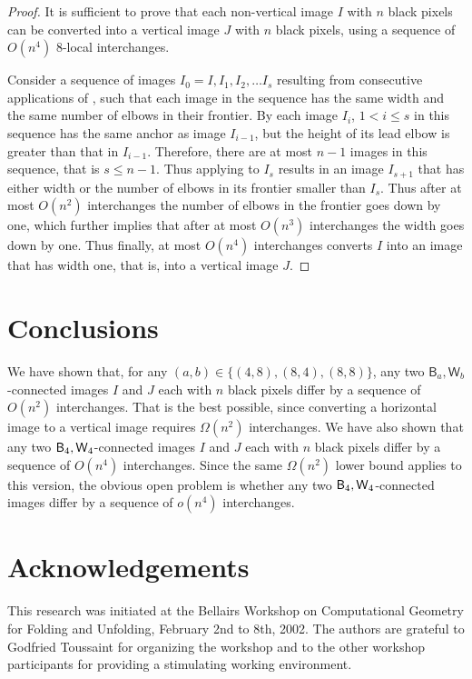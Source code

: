 \documentclass[lotsofwhite,charterfonts]{patmorin}
\newcommand{\fourfour}{\ensuremath{\protect\textup{\textsf{B}}_{4},\protect\textup{\textsf{W}}_{4}}}
\begin{document}
\begin{proof}
It is sufficient to prove that each non-vertical image $I$ with $n$ black pixels can be converted into a vertical image $J$ with $n$ black pixels, using a sequence of $O(n^4)$ 8-local interchanges. 

Consider a sequence of images $I_0=I, I_1, I_2, \dots I_s$ resulting
from consecutive applications of , such that each
image in the sequence has the same width and the same number of elbows
in their frontier. By  each image $I_i$, $1<i\leq s$
in this sequence has the same anchor as image $I_{i-1}$, but the
height of its lead elbow is greater than that in $I_{i-1}$. Therefore,
there are at most $n-1$ images in this sequence, that is $s\leq n-1$.
Thus applying  to $I_s$ results in an image
$I_{s+1}$ that has either width or the number of elbows in its
frontier smaller than $I_s$. Thus after at most $O(n^2)$ interchanges
the number of elbows in the frontier goes down by one, which further
implies that after at most $O(n^3)$ interchanges the width goes down
by one. Thus finally, at most $O(n^4)$ interchanges converts $I$ into
an image that has width one, that is, into a vertical image $J$.
\end{proof}


\section{Conclusions} 

We have shown that, for any $(a,b)\in\{(4,8),(8,4),(8,8)\}$, any two
$\textsf{B}_a,\textsf{W}_b$-connected images $I$ and $J$ each with
$n$ black pixels differ by a sequence of $O(n^2)$ interchanges. That
is the best possible, since converting a horizontal image to a
vertical image requires $\Omega(n^2)$ interchanges. We have also shown
that any two \fourfour-connected images $I$ and $J$ each with $n$
black pixels differ by a sequence of $O(n^4)$ interchanges. Since the
same $\Omega(n^2)$ lower bound applies to this version, the obvious
open problem is whether any two \fourfour-connected images  differ by
a sequence of $o(n^4)$ interchanges.

\section*{Acknowledgements}

This research was initiated at the Bellairs Workshop on Computational
Geometry for Folding and Unfolding, February 2nd to 8th, 2002.  The
authors are grateful to Godfried Toussaint for organizing the workshop
and to the other workshop participants for providing a stimulating
working environment.



\end{document}
